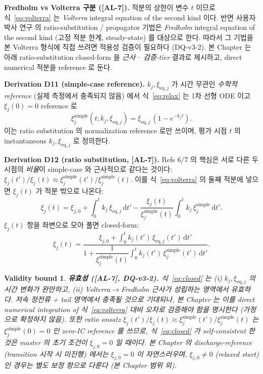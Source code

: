 \documentclass[11pt,a4paper]{article}
\newtheorem*{boundbox}{Validity bound}
\newcommand{\dd}{\mathrm{d}}
\newcommand{\eq}{\mathrm{eq}}
\newcommand{\simplecase}{\mathrm{simple}}
\newcommand{\AL}[1]{\textsf{[AL-#1]}}
\begin{document}
\textbf{Fredholm vs Volterra 구분 (\AL{7}).} 적분의 상한이 변수 $t$ 이므로
식~\eqref{eq:volterra} 는 \emph{Volterra} integral equation of the second kind 이다.
반면 사용자 박사 연구 \cite{lee2011,son2013} 의 ratio-substitution / propagator 기법은
\emph{Fredholm} integral equation of the second kind (고정 적분 한계, steady-state)
를 대상으로 한다. 따라서 그 기법을 본 Volterra 형식에 직접 쓰려면 적용성 검증이
필요하다 (DQ-v3-2). 본 Chapter 는 아래 ratio-substitution closed-form 을 \emph{근사·
검증-tier} 결과로 제시하고, direct numerical 적분을 reference 로 둔다.

\textbf{Derivation D11 (simple-case reference).} $k_j,\xi_{\eq,j}$ 가 시간 무관인
\emph{수학적 reference} (실제 측정에서 충족되지 않음) 에서 식~\eqref{eq:relax} 는 1차
선형 ODE 이고 $\xi_j(0)=0$ reference 로
\begin{equation}
\xi_j^{\simplecase}(t;k_j,\xi_{\eq,j}) = \xi_{\eq,j}\,(1-e^{-k_j t}).
\label{eq:simple}
\end{equation}
이는 ratio substitution 의 normalization reference 로만 쓰이며, 평가 시점 $t$ 의
instantaneous $k_j,\xi_{\eq,j}$ 로 정의한다.

\textbf{Derivation D12 (ratio substitution, \AL{7}).} Refs 6/7 의 핵심은 서로 다른 두
시점의 \emph{비율}이 simple-case 와 근사적으로 같다는 것이다:
$\xi_j(t')/\xi_j(t)\approx\xi_j^{\simplecase}(t')/\xi_j^{\simplecase}(t)$. 이를
식~\eqref{eq:volterra} 의 둘째 적분에 넣으면 $\xi_j(t)$ 가 적분 밖으로 나온다:
\begin{equation}
\xi_j(t) = \xi_{j,0} + \int_0^t k_j\,\xi_{\eq,j}\,\dd t' - \frac{\xi_j(t)}{\xi_j^{\simplecase}(t)}\int_0^t k_j\,\xi_j^{\simplecase}\,\dd t'.
\label{eq:after_sub}
\end{equation}
$\xi_j(t)$ 항을 좌변으로 모아 풀면 closed-form:
\begin{equation}
\boxed{\;\xi_j(t) = \frac{\xi_{j,0} + \displaystyle\int_0^t k_j(t')\,\xi_{\eq,j}(t')\,\dd t'}{1 + \dfrac{1}{\xi_j^{\simplecase}(t)}\displaystyle\int_0^t k_j(t')\,\xi_j^{\simplecase}(t')\,\dd t'}.\;}
\label{eq:closed}
\end{equation}
\begin{boundbox}
\textbf{유효성 (\AL{7}, DQ-v3-2).} 식~\eqref{eq:closed} 는 (i) $k_j,\xi_{\eq,j}$ 의
시간 변화가 완만하고, (ii) Volterra$\to$Fredholm 근사가 성립하는 영역에서 유효하다.
저속 정전류 + tail 영역에서 충족될 것으로 기대되나, 본 Chapter 는 이를 \emph{direct
numerical integration of} 식~\eqref{eq:volterra} \emph{대비 오차로 검증}해야 함을
명시한다 (가정으로 확정하지 않음). 또한 ratio ansatz
$\xi_j(t')/\xi_j(t)\approx\xi_j^{\simplecase}(t')/\xi_j^{\simplecase}(t)$ 는
$\xi_j^{\simplecase}(0)=0$ 인 zero-IC reference 를 쓰므로, 식~\eqref{eq:closed} 가
self-consistent 한 것은 master 의 초기 조건이 $\xi_{j,0}=0$ 일 때이다. 본 Chapter 의
discharge-reference (transition 시작 시 미진행) 에서는 $\xi_{j,0}=0$ 이 자연스러우며,
$\xi_{j,0}\ne0$ (relaxed start) 인 경우는 별도 보정 항으로 다룬다 (본 Chapter 범위 외).
\end{boundbox}
\end{document}

